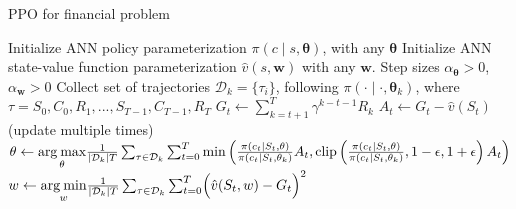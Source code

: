 \documentclass[balance,upint,subscriptcorrection,varvw,mathalfa=cal=boondoxo,pdf-a,colorlinks,nofoot]{asmeconf}
\begin{document}
\begin{algorithm*}
    \caption{PPO for financial problem}\label{algorithm:ppo}
    \begin{algorithmic}[1]
        \State Initialize ANN policy parameterization
        \(\pi\left(c\middle|s, \bm{\theta}\right)\), with any \(\bm{\theta}\)
        \State Initialize ANN state-value function parameterization
        \(\hat{v}(s,\bm{w})\) with any \(\bm{w}\).
        \State Step sizes \(\alpha_{\bm{\theta}}>0\), \(\alpha_{\bm{w}}>0\)
        \State Collect set of trajectories \(\mathcal{D}_k=\{\tau_i\}\),
        following \(\pi\left(\cdot\middle|\cdot, \bm{\theta}_k\right)\), where
        \(\tau = S_0, C_0, R_1, ..., S_{T-1}, C_{T-1}, R_T\)
        \State \(G_t \gets \sum_{k=t+1}^{T} \gamma^{k-t-1}R_k\)
        \State \(A_t \gets G_t - \hat{v}(S_t)\)
        \EndFor
        \Loop \hspace{0.3mm} (update multiple times)
        \State \(\bm{\theta} \gets \underset{\bm{\theta}}{\text{arg\:max}}
        \frac{1}{|\mathcal{D}_k|T}
        \sum_{\tau\in\mathcal{D}_k}^{} \sum_{t=0}^{T}
        \min{\left(
                \frac{\pi\left(c_t\middle|S_t, \bm{\theta}\right)}
                {\pi\left(c_t\middle|S_t, \bm{\theta}_k\right)}A_t,
                \text{clip}\left(
                    \frac{\pi\left(c_t\middle|S_t, \bm{\theta}\right)}
                    {\pi\left(c_t\middle|S_t, \bm{\theta}_k\right)},
                    1-\epsilon, 1+\epsilon
                \right)A_t
        \right)}\)
        \State \(\bm{w} \gets \underset{\bm{w}}{\text{arg\:min}}
        \frac{1}{|\mathcal{D}_k|T}\sum_{\tau\in\mathcal{D}_k}^{} \sum_{t=0}^{T}
        \Bigl(\hat{v}(S_t, \bm{w})-G_t\Bigr)^2\)
        \EndLoop
        \EndFor
    \end{algorithmic}
\end{algorithm*}
\end{document}
